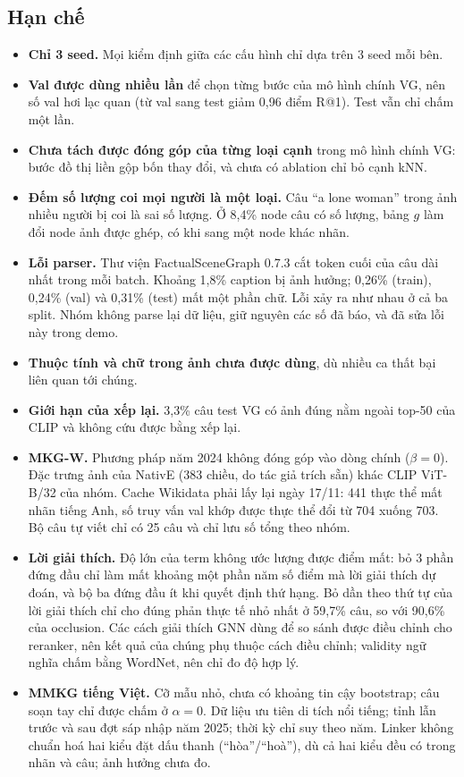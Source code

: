 \subsection{Hạn chế}
\begin{itemize}
\item \textbf{Chỉ 3 seed.} Mọi kiểm định giữa các cấu hình chỉ dựa trên 3 seed mỗi bên.
\item \textbf{Val được dùng nhiều lần} để chọn từng bước của mô hình chính VG, nên số val hơi lạc quan (từ val sang test giảm
0,96 điểm R@1). Test vẫn chỉ chấm một lần.
\item \textbf{Chưa tách được đóng góp của từng loại cạnh} trong mô hình chính VG: bước đồ thị liền gộp bốn thay đổi, và chưa có
ablation chỉ bỏ cạnh kNN.
\item \textbf{Đếm số lượng coi mọi người là một loại.} Câu ``a lone woman'' trong ảnh nhiều người bị coi là sai số lượng.
Ở 8,4\% node câu có số lượng, bảng $g$ làm đổi node ảnh được ghép, có khi sang một node khác nhãn.
\item \textbf{Lỗi parser.} Thư viện FactualSceneGraph 0.7.3 cắt token cuối của câu dài nhất trong mỗi batch. Khoảng 1,8\%
caption bị ảnh hưởng; 0,26\% (train), 0,24\% (val) và 0,31\% (test) mất một phần chữ. Lỗi xảy ra như nhau ở cả ba split.
Nhóm không parse lại dữ liệu, giữ nguyên các số đã báo, và đã sửa lỗi này trong demo.
\item \textbf{Thuộc tính và chữ trong ảnh chưa được dùng}, dù nhiều ca thất bại liên quan tới chúng.
\item \textbf{Giới hạn của xếp lại.} 3,3\% câu test VG có ảnh đúng nằm ngoài top-50 của CLIP và không cứu được bằng xếp lại.
\item \textbf{MKG-W.} Phương pháp năm 2024 không đóng góp vào dòng chính ($\beta = 0$). Đặc trưng ảnh của NativE (383 chiều,
do tác giả trích sẵn) khác CLIP ViT-B/32 của nhóm. Cache Wikidata phải lấy lại ngày 17/11: 441 thực thể mất nhãn tiếng Anh,
số truy vấn val khớp được thực thể đổi từ 704 xuống 703. Bộ câu tự viết chỉ có 25 câu và chỉ lưu số tổng theo nhóm.
\item \textbf{Lời giải thích.} Độ lớn của term không ước lượng được điểm mất: bỏ 3 phần đứng đầu chỉ làm mất khoảng một
phần năm số điểm mà lời giải thích dự đoán, và bộ ba đứng đầu ít khi quyết định thứ hạng. Bỏ dần theo thứ tự của lời giải
thích chỉ cho đúng phản thực tế nhỏ nhất ở 59,7\% câu, so với 90,6\% của occlusion. Các cách giải thích GNN dùng để so sánh
được điều chỉnh cho reranker, nên kết quả của chúng phụ thuộc cách điều chỉnh; validity ngữ nghĩa chấm bằng WordNet, nên chỉ
đo độ hợp lý.
\item \textbf{MMKG tiếng Việt.} Cỡ mẫu nhỏ, chưa có khoảng tin cậy bootstrap; câu soạn tay chỉ được chấm ở $\alpha=0$. Dữ liệu
ưu tiên di tích nổi tiếng; tỉnh lẫn trước và sau đợt sáp nhập năm 2025; thời kỳ chỉ suy theo năm. Linker không chuẩn hoá hai
kiểu đặt dấu thanh (``hòa''/``hoà''), dù cả hai kiểu đều có trong nhãn và câu; ảnh hưởng chưa đo.
\end{itemize}

